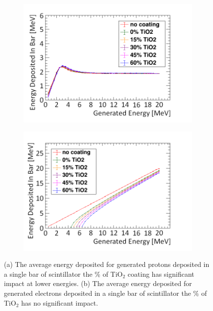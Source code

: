 \begin{figure}[!h]
\centering
\begin{subfigure}{.5\textwidth}
  \centering
  \includegraphics[width=\linewidth]{Chapter4/Figs/Raster/electronEdepTiO2Coating.png}
  \captionsetup{width=.9\linewidth}
  \caption{}
  \label{subFig:proton_TiO2}
\end{subfigure}%
\begin{subfigure}{.5\textwidth}
  \centering
  \includegraphics[width=\linewidth]{Chapter4/Figs/Raster/protonsEdepTiO2Coating.png}
  \captionsetup{width=.9\linewidth}
  \caption{}
  \label{subFig:muon_TiO2}
\end{subfigure}
\caption{(a) The average energy deposited for generated protons deposited in a single bar of scintillator the \%  of TiO$_2$ coating has significant impact at lower energies. (b) The average energy deposited for generated electrons deposited in a single bar of scintillator the \% of TiO$_2$ has no significant impact.}
\label{fig:muonProton_TiO2}
\end{figure}

